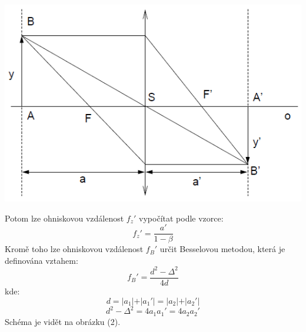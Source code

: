 \documentclass[a4paper,11pt]{article}
\begin{document}
    \begin{minipage}[t]{0.5\textwidth} 
                \vspace{0pt}   
                \par \centering
                \includegraphics[scale=0.35]{prim}
                \captionsetup{justification=centering, font=footnotesize}
                \label{fig:prim}
                \vspace{10pt}
                \raggedright
                \vspace{10pt}
                \par Potom lze ohniskovou vzdálenost $f_z'$ vypočítat podle vzorce:
                \begin{equation}
                    f_z' = \frac{a'}{1 - \beta}
                \end{equation}
                Kromě toho lze ohniskovou vzdálenost $f_B'$ určit Besselovou metodou, která je definována vztahem:
                \begin{equation}
                    f_B' = \frac{d^2 - \Delta^2}{4d}
                \end{equation}
                kde: 
                \begin{equation}
                    d = \vert a_1 \vert + \vert a_1' \vert = \vert a_2 \vert + \vert a_2' \vert
                \end{equation}
                \begin{equation}
                    d^2-\Delta^2 = 4a_1 a_1' = 4a_2 a_2'
                \end{equation}   
                Schéma je vidět na obrázku (2).

\end{minipage}
\end{document}
